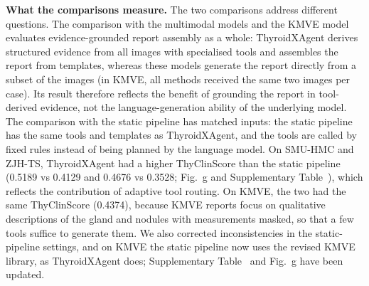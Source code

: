 \textbf{What the comparisons measure.} The two comparisons address different questions. The comparison with the multimodal models and the KMVE model evaluates evidence-grounded report assembly as a whole: ThyroidXAgent derives structured evidence from all images with specialised tools and assembles the report from templates, whereas these models generate the report directly from a subset of the images (in KMVE, all methods received the same two images per case). Its result therefore reflects the benefit of grounding the report in tool-derived evidence, not the language-generation ability of the underlying model. The comparison with the static pipeline has matched inputs: the static pipeline has the same tools and templates as ThyroidXAgent, and the tools are called by fixed rules instead of being planned by the language model. On SMU-HMC and ZJH-TS, ThyroidXAgent had a higher ThyClinScore than the static pipeline (0.5189 vs 0.4129 and 0.4676 vs 0.3528; Fig.~\FigReportGen{}g and Supplementary Table~\SuppTabStatic{}), which reflects the contribution of adaptive tool routing. On KMVE, the two had the same ThyClinScore (0.4374), because KMVE reports focus on qualitative descriptions of the gland and nodules with measurements masked, so that a few tools suffice to generate them. We also corrected inconsistencies in the static-pipeline settings, and on KMVE the static pipeline now uses the revised KMVE library, as ThyroidXAgent does; Supplementary Table~\SuppTabStatic{} and Fig.~\FigReportGen{}g have been updated.\par
